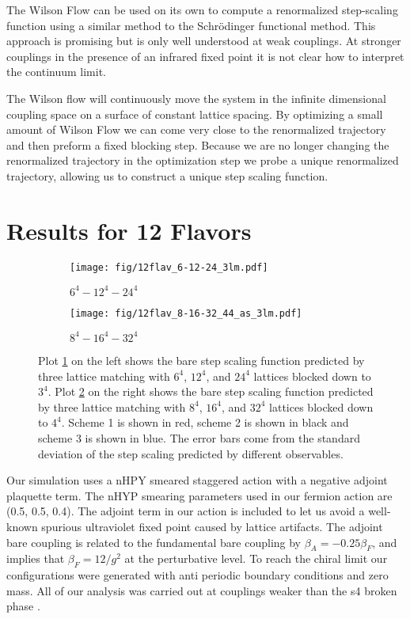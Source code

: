\documentclass{PoS}
\begin{document}
The Wilson Flow can be used on its own to compute a renormalized step-scaling function using a similar method to the Schrödinger functional method.
This approach is promising but is only well understood at weak couplings.
At stronger couplings in the presence of an infrared fixed point it is not clear how to interpret the continuum limit.

The Wilson flow will continuously move the system in the infinite dimensional coupling space on a surface of constant lattice spacing.
By optimizing a small amount of Wilson Flow we can come very close to the renormalized trajectory and then preform a fixed blocking step.
Because we are no longer changing the renormalized trajectory in the optimization step we probe a unique renormalized trajectory, allowing us to construct a unique step scaling function.



\section{Results for 12 Flavors}
\label{sec:results}
\begin{figure}[h]
  \centering
  \begin{subfigure}[b]{0.48\textwidth}
    \texttt{[image: fig/12flav\_6-12-24\_3lm.pdf]}
    \caption{$6^4-12^4-24^4$}
    \label{fig:6-12-24_33}
  \end{subfigure}
  \begin{subfigure}[b]{0.48\textwidth}
    \texttt{[image: fig/12flav\_8-16-32\_44\_as\_3lm.pdf]}
    \caption{$8^4-16^4-32^4$}
    \label{fig:8-16-32_44}
  \end{subfigure}
  \caption{Plot \ref{fig:6-12-24_33} on the left shows the bare step scaling function predicted by three lattice matching with $6^4$, $12^4$, and $24^4$ lattices blocked down to $3^4$.  Plot \ref{fig:8-16-32_44} on the right shows the bare step scaling function predicted by three lattice matching with $8^4$, $16^4$, and $32^4$ lattices blocked down to $4^4$.  Scheme 1 is shown in red, scheme 2 is shown in black and scheme 3 is shown in blue.  The error bars come from the standard deviation of the step scaling predicted by different observables.}
\label{fig:multischeme}
\end{figure}

Our simulation uses a nHPY smeared staggered action with a negative adjoint plaquette term.
The nHYP smearing parameters used in our fermion action are (0.5, 0.5, 0.4).
The adjoint term in our action is included to let us avoid a well-known spurious ultraviolet fixed point caused by lattice artifacts.
The adjoint bare coupling is related to the fundamental bare coupling by $\beta_A=-0.25\beta_F$, and implies that $\beta_F=12/g^2$ at the perturbative level.
To reach the chiral limit our configurations were generated with anti periodic boundary conditions and zero mass.
All of our analysis was carried out at couplings weaker than the s4 broken phase \cite{}.
\end{document}
